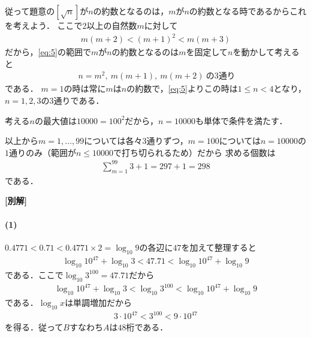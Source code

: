 \documentclass[../../main.tex]{subfiles}
\begin{document}
従って題意の$[\sqrt{n}]$が$n$の約数となるのは，$m$が$n$の約数となる時であるからこれを考えよう．
ここで2以上の自然数$m$に対して
\begin{align}
  m(m+2) < (m+1)^2 < m(m+3)
\end{align}
だから，\cref{eq:5}の範囲で$m$が$n$の約数となるのは$m$を固定して$n$を動かして考えると
\begin{align}
  \ n=m^2,\ m(m+1),\ m(m+2)\ \text{の}3\text{通り}
\end{align}
である．
$m=1$の時は常に$m$は$n$の約数で，\cref{eq:5}よりこの時は$1 \le n < 4$となり，$n=1,2,3$の$3$通りである．

考える$n$の最大値は$10000=100^2$だから，$n=10000$も単体で条件を満たす．

以上から$m=1,\dots,99$については各々$3$通りずつ，$m=100$については$n=10000$の$1$通りのみ（範囲が$n\le10000$で打ち切られるため）だから
求める個数は
\begin{align}
  \sum_{m=1}^{99}3+1=297+1=298
\end{align}
である．

{\bf [別解]}

\paragraph{(1)}

$0.4771<0.71<0.4771\times2=\log_{10}9$の各辺に$47$を加えて整理すると
\begin{align}
  \log_{10}10^{47}+\log_{10}3<47.71<\log_{10}10^{47}+\log_{10}9
\end{align}
である．ここで$\log_{10} 3^{100}=47.71$だから
\begin{align}
  \log_{10}10^{47}+\log_{10}3<\log_{10} 3^{100}<\log_{10}10^{47}+\log_{10}9
\end{align}
である．$\log_{10}x$は単調増加だから
\begin{align}
  3\cdot10^{47}<3^{100}<9\cdot10^{47}
\end{align}
を得る．従って$B$すなわち$A$は$48$桁である．

\newpage
\end{document}

